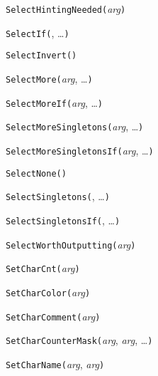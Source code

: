 
\noindent\texttt{SelectHintingNeeded(}\textit{arg}\texttt{)}


\noindent\texttt{SelectIf(}, \ldots\texttt{)}


\noindent\texttt{SelectInvert(}\texttt{)}


\noindent\texttt{SelectMore(}\textit{arg}, \ldots\texttt{)}


\noindent\texttt{SelectMoreIf(}\textit{arg}, \ldots\texttt{)}


\noindent\texttt{SelectMoreSingletons(}\textit{arg}, \ldots\texttt{)}


\noindent\texttt{SelectMoreSingletonsIf(}\textit{arg}, \ldots\texttt{)}


\noindent\texttt{SelectNone(}\texttt{)}


\noindent\texttt{SelectSingletons(}, \ldots\texttt{)}


\noindent\texttt{SelectSingletonsIf(}, \ldots\texttt{)}


\noindent\texttt{SelectWorthOutputting(}\textit{arg}\texttt{)}


\noindent\texttt{SetCharCnt(}\textit{arg}\texttt{)}


\noindent\texttt{SetCharColor(}\textit{arg}\texttt{)}


\noindent\texttt{SetCharComment(}\textit{arg}\texttt{)}


\noindent\texttt{SetCharCounterMask(}\textit{arg}, \textit{arg}, \ldots\texttt{)}


\noindent\texttt{SetCharName(}\textit{arg}, \textit{arg}\texttt{)}


